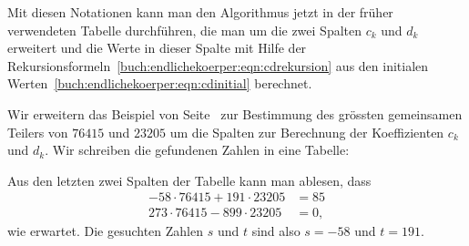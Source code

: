 Mit diesen Notationen kann man den Algorithmus jetzt in der früher
verwendeten Tabelle durchführen, die man um die zwei
Spalten $c_k$ und $d_k$ erweitert und die Werte in dieser
Spalte mit Hilfe der
Rekursionsformeln~\eqref{buch:endlichekoerper:eqn:cdrekursion}
aus den initialen Werten~\eqref{buch:endlichekoerper:eqn:cdinitial}
berechnet.

\begin{beispiel}
Wir erweitern das Beispiel von Seite~\pageref{buch:endlichekoerper:beispiel1}
zur Bestimmung des grössten gemeinsamen Teilers von $76415$ und $23205$
um die Spalten zur Berechnung der Koeffizienten $c_k$ und $d_k$.
Wir schreiben die gefundenen Zahlen in eine Tabelle:
\begin{center}
\label{buch:endlichekoerper:beispiel1erweitert}
\end{center}
Aus den letzten zwei Spalten der Tabelle kann man ablesen, dass
\begin{align*}
-58\cdot 76415 + 191\cdot 23205 &= 85\\
273\cdot 76415 - 899\cdot 23205 &= 0,
\end{align*}
wie erwartet.
Die gesuchten Zahlen $s$ und $t$ sind also $s=-58$ und $t=191$.
\end{beispiel}

